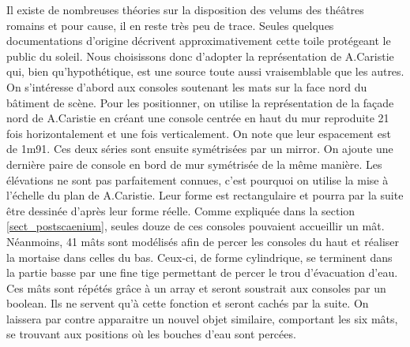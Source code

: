 Il existe de nombreuses théories sur la disposition des \glspl{velum} des théâtres romains et pour cause, il en reste très peu de trace. Seules quelques documentations d'origine  décrivent approximativement cette toile protégeant le public du soleil. Nous choisissons donc d'adopter la représentation de A.Caristie \cite[Pl. VI]{orangePl} qui, bien qu'hypothétique, est une source toute aussi vraisemblable que les autres. On s'intéresse d'abord aux consoles soutenant les mats sur la face nord du bâtiment de scène. Pour les positionner, on utilise la représentation de la façade nord de A.Caristie \cite[Pl. III]{orangePl} en créant une console centrée en haut du mur reproduite 21 fois horizontalement et une fois verticalement. On note que leur espacement est de 1m91. Ces deux séries sont ensuite symétrisées par un \gls{mirror}. On ajoute une dernière paire de console en bord de mur symétrisée de la même manière. Les élévations ne sont pas parfaitement connues, c'est pourquoi on utilise la mise à l'échelle du plan de A.Caristie. Leur forme est rectangulaire et pourra par la suite être dessinée d'après leur forme réelle. Comme expliquée dans la section \ref{sect_postscaenium}, seules douze de ces consoles pouvaient accueillir un mât. Néanmoins, 41 mâts sont modélisés afin de percer les consoles du haut et réaliser la mortaise dans celles du bas. Ceux-ci, de forme cylindrique, se terminent dans la partie basse par une fine tige permettant de percer le trou d'évacuation d'eau. Ces mâts sont répétés grâce à un \gls{array} et seront soustrait aux consoles par un \gls{boolean}. Ils ne servent qu'à cette fonction et seront cachés par la suite. On laissera par contre apparaitre un nouvel objet similaire, comportant les six mâts, se trouvant aux positions où les bouches d'eau sont percées. 

